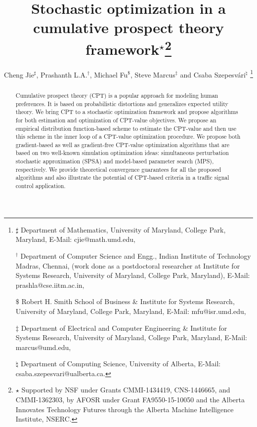\documentclass[twocolumn]{IEEEtran}
\begin{document}
\title{Stochastic optimization in a cumulative prospect theory framework$^\star$\thanks{$\star$ Supported by NSF under Grants CMMI-1434419, CNS-1446665, and
CMMI-1362303, by AFOSR under Grant FA9550-15-10050 and the Alberta Innovates Technology Futures through the Alberta Machine Intelligence Institute, NSERC.}}
\author{Cheng Jie$^\sharp$, Prashanth L.A.$^\dagger$, Michael Fu$^\$$, Steve Marcus$^\ddag$ and Csaba Szepesv\'ari$^\natural$
\thanks{
$\sharp$ Department of Mathematics,
University of Maryland, College Park, Maryland, 
E-Mail: cjie@math.umd.edu, 

$^\dagger$ Department of Computer Science and Engg., Indian Institute of Technology Madras, Chennai,
(work done as a postdoctoral researcher at Institute for Systems Research, University of Maryland, College Park, Maryland),
E-Mail: prashla@cse.iitm.ac.in,

$\$$ Robert H. Smith School of Business \& Institute for Systems Research,
University of Maryland, College Park, Maryland,
E-Mail: mfu@isr.umd.edu,

$\ddag$ Department of Electrical and Computer Engineering \& Institute for Systems Research,
University of Maryland, College Park, Maryland,
 E-Mail: marcus@umd.edu,

$\natural$ Department of Computing Science,
University of Alberta,
 E-Mail: csaba.szepesvari@ualberta.ca.
}}
\maketitle


\begin{abstract}
Cumulative prospect theory (CPT) is a popular approach for modeling human preferences. It is based on probabilistic distortions and generalizes expected utility theory.  We bring CPT to a stochastic optimization framework and propose algorithms for both estimation and optimization of CPT-value objectives. We propose an empirical distribution function-based scheme to estimate the CPT-value and then use this scheme in the inner loop of a CPT-value optimization procedure. We propose both gradient-based as well as gradient-free CPT-value optimization algorithms that are based on two well-known simulation optimization ideas: simultaneous perturbation stochastic approximation (SPSA) and model-based parameter search (MPS), respectively.  We provide theoretical convergence guarantees for all the proposed algorithms 
and also illustrate the potential of CPT-based criteria in a traffic signal control application.
\end{abstract}
\end{document}
